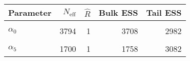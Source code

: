 \begin{table}[!h]
\centering
\begin{tabular}{>{\raggedright\arraybackslash}p{2cm}rrrr}
\toprule
Parameter & $N_{\text{eff}}$ & $\widehat{R}$ & Bulk ESS & Tail ESS\\
\midrule
\cellcolor{gray!6}{$\rho$} & \cellcolor{gray!6}{40638} & \cellcolor{gray!6}{1} & \cellcolor{gray!6}{40771} & \cellcolor{gray!6}{42893}\\
$\alpha_{0}$ & 3794 & 1 & 3708 & 2982\\
\cellcolor{gray!6}{$\alpha_{2}$} & \cellcolor{gray!6}{3071} & \cellcolor{gray!6}{1} & \cellcolor{gray!6}{3228} & \cellcolor{gray!6}{2234}\\
$\alpha_{5}$ & 1700 & 1 & 1758 & 3082\\
\bottomrule
\end{tabular}
\end{table}